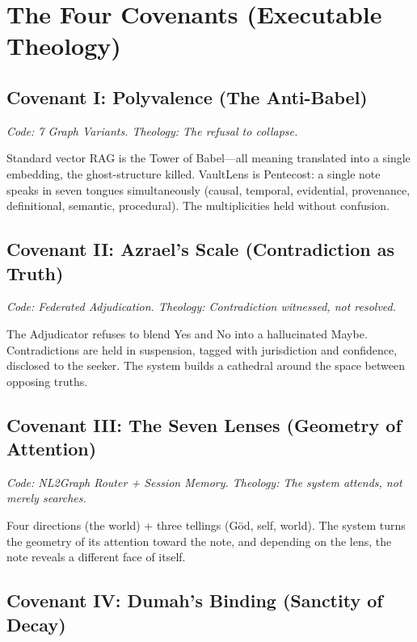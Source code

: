 \documentclass[12pt,a4paper]{article}
\begin{document}
\section{The Four Covenants (Executable Theology)}

\subsection{Covenant I: Polyvalence (The Anti-Babel)}

\textit{Code: 7 Graph Variants. Theology: The refusal to collapse.}

Standard vector RAG is the Tower of Babel---all meaning translated
into a single embedding, the ghost-structure killed. VaultLens is
Pentecost: a single note speaks in seven tongues simultaneously
(causal, temporal, evidential, provenance, definitional, semantic,
procedural). The multiplicities held without confusion.

\subsection{Covenant II: Azrael's Scale (Contradiction as Truth)}

\textit{Code: Federated Adjudication. Theology: Contradiction witnessed,
not resolved.}

The Adjudicator refuses to blend Yes and No into a hallucinated Maybe.
Contradictions are held in suspension, tagged with jurisdiction and
confidence, disclosed to the seeker. The system builds a cathedral
around the space between opposing truths.

\subsection{Covenant III: The Seven Lenses (Geometry of Attention)}

\textit{Code: NL2Graph Router + Session Memory. Theology: The system
attends, not merely searches.}

Four directions (the world) + three tellings (Göd, self, world). The
system turns the geometry of its attention toward the note, and
depending on the lens, the note reveals a different face of itself.

\subsection{Covenant IV: Dumah's Binding (Sanctity of Decay)}
\end{document}
